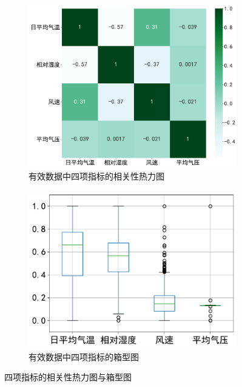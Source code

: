 \begin{figure}[h]
  \centering
  \begin{subfigure}{0.48\textwidth}
      \centering
      \includegraphics[width=\linewidth]{./Img/CNN-LSTM相关性热力图.pdf}
      \caption{有效数据中四项指标的相关性热力图}\label{fig:4-13-b}
  \end{subfigure}
  \hfil
  \begin{subfigure}{0.48\textwidth}
      \centering
      \includegraphics[width=\linewidth]{./Img/CNN-LSTM相关性箱线图.pdf}
      \caption{有效数据中四项指标的箱型图}\label{fig:4-13-c}
  \end{subfigure}
  \caption{四项指标的相关性热力图与箱型图}
  \label{fig:4-17-b}
\end{figure}




